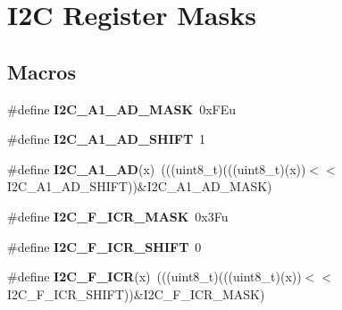 \hypertarget{group__I2C__Register__Masks}{}\section{I2C Register Masks}
\label{group__I2C__Register__Masks}
\subsection*{Macros}
\begin{DoxyCompactItemize}
\item 
\#define {\bfseries I2\+C\+\_\+\+A1\+\_\+\+A\+D\+\_\+\+M\+A\+SK}~0x\+F\+Eu\hypertarget{group__I2C__Register__Masks_gad90fbd42f33b89ff3296c52700771b1b}{}\label{group__I2C__Register__Masks_gad90fbd42f33b89ff3296c52700771b1b}

\item 
\#define {\bfseries I2\+C\+\_\+\+A1\+\_\+\+A\+D\+\_\+\+S\+H\+I\+FT}~1\hypertarget{group__I2C__Register__Masks_gaf074658893634b95a9858ee29bbdd88a}{}\label{group__I2C__Register__Masks_gaf074658893634b95a9858ee29bbdd88a}

\item 
\#define {\bfseries I2\+C\+\_\+\+A1\+\_\+\+AD}(x)~(((uint8\+\_\+t)(((uint8\+\_\+t)(x))$<$$<$I2\+C\+\_\+\+A1\+\_\+\+A\+D\+\_\+\+S\+H\+I\+FT))\&I2\+C\+\_\+\+A1\+\_\+\+A\+D\+\_\+\+M\+A\+SK)\hypertarget{group__I2C__Register__Masks_ga5248771248d1964b566ca3de1cadf6a3}{}\label{group__I2C__Register__Masks_ga5248771248d1964b566ca3de1cadf6a3}

\item 
\#define {\bfseries I2\+C\+\_\+\+F\+\_\+\+I\+C\+R\+\_\+\+M\+A\+SK}~0x3\+Fu\hypertarget{group__I2C__Register__Masks_gaeb777a93b5695409902fb2f2b77eb760}{}\label{group__I2C__Register__Masks_gaeb777a93b5695409902fb2f2b77eb760}

\item 
\#define {\bfseries I2\+C\+\_\+\+F\+\_\+\+I\+C\+R\+\_\+\+S\+H\+I\+FT}~0\hypertarget{group__I2C__Register__Masks_ga8e2daf0de75e77e33467f6b132be0c30}{}\label{group__I2C__Register__Masks_ga8e2daf0de75e77e33467f6b132be0c30}

\item 
\#define {\bfseries I2\+C\+\_\+\+F\+\_\+\+I\+CR}(x)~(((uint8\+\_\+t)(((uint8\+\_\+t)(x))$<$$<$I2\+C\+\_\+\+F\+\_\+\+I\+C\+R\+\_\+\+S\+H\+I\+FT))\&I2\+C\+\_\+\+F\+\_\+\+I\+C\+R\+\_\+\+M\+A\+SK)\hypertarget{group__I2C__Register__Masks_ga18089fd1cbe1936b133d50d580d39e6d}{}\label{group__I2C__Register__Masks_ga18089fd1cbe1936b133d50d580d39e6d}


\end{DoxyCompactItemize}
